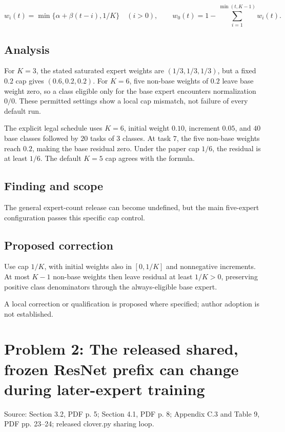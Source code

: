 \documentclass[11pt]{article}
\begin{document}
\[ w_i(t)=\min\{\alpha+\beta(t-i),1/K\}\quad(i>0),\qquad w_0(t)=1-\sum_{i=1}^{\min(t,K-1)}w_i(t). \]

\subsection*{Analysis}

For \(K=3\), the stated saturated expert weights are \((1/3,1/3,1/3)\), but a fixed \(0.2\) cap gives \((0.6,0.2,0.2)\). For \(K=6\), five non-base weights of \(0.2\) leave base weight zero, so a class eligible only for the base expert encounters normalization \(0/0\). These permitted settings show a local cap mismatch, not failure of every default run.

The explicit legal schedule uses \(K=6\), initial weight \(0.10\), increment \(0.05\), and \(40\) base classes followed by \(20\) tasks of \(3\) classes. At task \(7\), the five non-base weights reach \(0.2\), making the base residual zero. Under the paper cap \(1/6\), the residual is at least \(1/6\). The default \(K=5\) cap agrees with the formula.

\subsection*{Finding and scope}

The general expert-count release can become undefined, but the main five-expert configuration passes this specific cap control.

\subsection*{Proposed correction}

Use cap \(1/K\), with initial weights also in \([0,1/K]\) and nonnegative increments. At most \(K-1\) non-base weights then leave residual at least \(1/K>0\), preserving positive class denominators through the always-eligible base expert.

A local correction or qualification is proposed where specified; author adoption is not established.

\section*{Problem 2: The released shared, frozen ResNet prefix can change during later-expert training}

Source: Section 3.2, PDF p. 5; Section 4.1, PDF p. 8; Appendix C.3 and Table 9, PDF pp. 23–24; released clover.py sharing loop.
\end{document}
